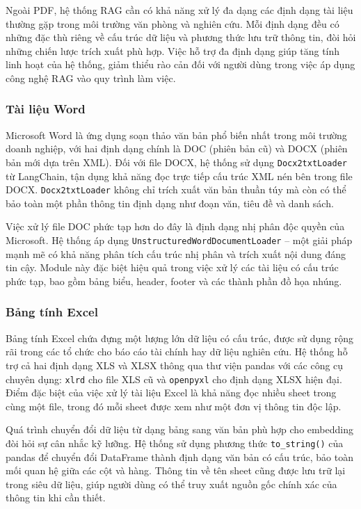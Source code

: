 Ngoài PDF, hệ thống RAG cần có khả năng xử lý đa dạng các định dạng tài liệu thường gặp trong môi trường văn phòng và nghiên cứu. Mỗi định dạng đều có những đặc thù riêng về cấu trúc dữ liệu và phương thức lưu trữ thông tin, đòi hỏi những chiến lược trích xuất phù hợp. Việc hỗ trợ đa định dạng giúp tăng tính linh hoạt của hệ thống, giảm thiểu rào cản đối với người dùng trong việc áp dụng công nghệ RAG vào quy trình làm việc.

\subsubsection{Tài liệu Word}

Microsoft Word là ứng dụng soạn thảo văn bản phổ biến nhất trong môi trường doanh nghiệp, với hai định dạng chính là DOC (phiên bản cũ) và DOCX (phiên bản mới dựa trên XML). Đối với file DOCX, hệ thống sử dụng \texttt{Docx2txtLoader} từ LangChain, tận dụng khả năng đọc trực tiếp cấu trúc XML nén bên trong file DOCX. \texttt{Docx2txtLoader} không chỉ trích xuất văn bản thuần túy mà còn có thể bảo toàn một phần thông tin định dạng như đoạn văn, tiêu đề và danh sách.

Việc xử lý file DOC phức tạp hơn do đây là định dạng nhị phân độc quyền của Microsoft. Hệ thống áp dụng \texttt{UnstructuredWordDocumentLoader} -- một giải pháp mạnh mẽ có khả năng phân tích cấu trúc nhị phân và trích xuất nội dung đáng tin cậy. Module này đặc biệt hiệu quả trong việc xử lý các tài liệu có cấu trúc phức tạp, bao gồm bảng biểu, header, footer và các thành phần đồ họa nhúng.

\subsubsection{Bảng tính Excel}

Bảng tính Excel chứa đựng một lượng lớn dữ liệu có cấu trúc, được sử dụng rộng rãi trong các tổ chức cho báo cáo tài chính hay dữ liệu nghiên cứu. Hệ thống hỗ trợ cả hai định dạng XLS và XLSX thông qua thư viện pandas với các công cụ chuyên dụng: \texttt{xlrd} cho file XLS cũ và \texttt{openpyxl} cho định dạng XLSX hiện đại. Điểm đặc biệt của việc xử lý tài liệu Excel là khả năng đọc nhiều sheet trong cùng một file, trong đó mỗi sheet được xem như một đơn vị thông tin độc lập.

Quá trình chuyển đổi dữ liệu từ dạng bảng sang văn bản phù hợp cho embedding đòi hỏi sự cân nhắc kỹ lưỡng. Hệ thống sử dụng phương thức \texttt{to\_string()} của pandas để chuyển đổi DataFrame thành định dạng văn bản có cấu trúc, bảo toàn mối quan hệ giữa các cột và hàng. Thông tin về tên sheet cũng được lưu trữ lại trong siêu dữ liệu, giúp người dùng có thể truy xuất nguồn gốc chính xác của thông tin khi cần thiết.

